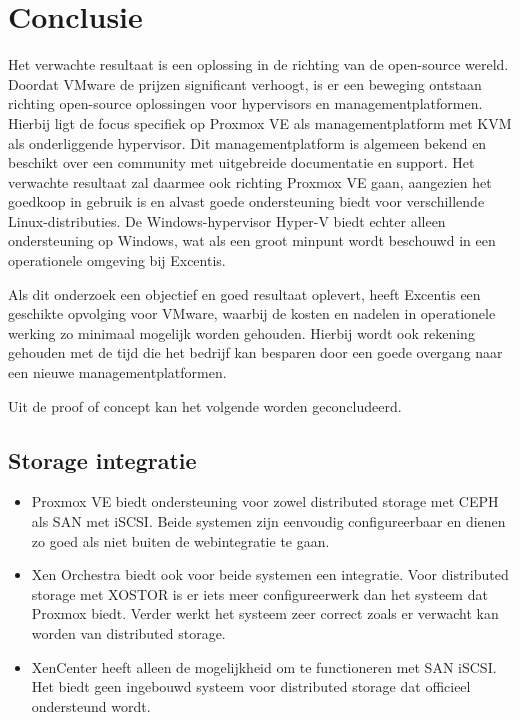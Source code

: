 
\chapter{Conclusie}%
\label{ch:conclusie}


Het verwachte resultaat is een oplossing in de richting van de open-source wereld. Doordat VMware de prijzen significant verhoogt, is er een beweging ontstaan richting open-source oplossingen voor hypervisors en managementplatformen.
Hierbij ligt de focus specifiek op Proxmox VE als managementplatform met KVM als onderliggende hypervisor. Dit managementplatform is algemeen bekend en beschikt over een community met uitgebreide documentatie en support.
Het verwachte resultaat zal daarmee ook richting Proxmox VE gaan, aangezien het goedkoop in gebruik is en alvast goede ondersteuning biedt voor verschillende Linux-distributies.
De Windows-hypervisor Hyper-V biedt echter alleen ondersteuning op Windows, wat als een groot minpunt wordt beschouwd in een operationele omgeving bij Excentis.

Als dit onderzoek een objectief en goed resultaat oplevert, heeft Excentis een geschikte opvolging voor VMware, waarbij de kosten en nadelen in operationele werking zo minimaal mogelijk worden gehouden.
Hierbij wordt ook rekening gehouden met de tijd die het bedrijf kan besparen door een goede overgang naar een nieuwe managementplatformen.

Uit de proof of concept kan het volgende worden geconcludeerd.
\section{Storage integratie}
\begin{itemize}
\item Proxmox VE biedt ondersteuning voor zowel distributed storage met CEPH als SAN met iSCSI. Beide systemen zijn eenvoudig configureerbaar en dienen zo goed als niet buiten de webintegratie te gaan.
\item Xen Orchestra biedt ook voor beide systemen een integratie. Voor distributed storage met XOSTOR is er iets meer configureerwerk dan het systeem dat Proxmox biedt. Verder werkt het systeem zeer correct zoals er verwacht kan worden van distributed storage.
\item XenCenter heeft alleen de mogelijkheid om te functioneren met SAN iSCSI. Het biedt geen ingebouwd systeem voor distributed storage dat officieel ondersteund wordt.
\end{itemize}

